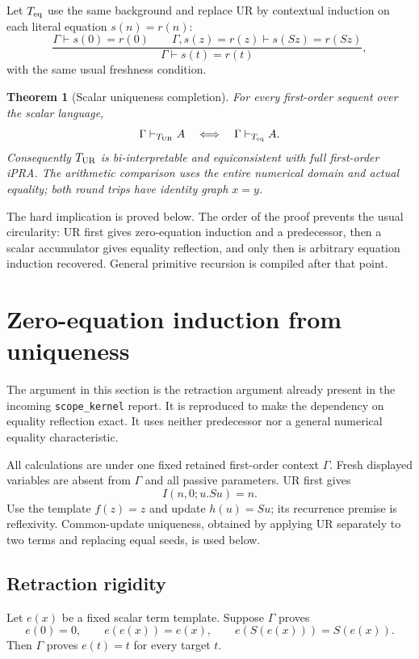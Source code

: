 \documentclass[11pt]{article}
\newtheorem{theorem}{Theorem}[section]
\begin{document}
Let $T_{\rm eq}$ use the same background and replace UR by contextual
induction on each literal equation $s(n)=r(n)$:
\[
 \frac{\Gamma\vdash s(0)=r(0)\qquad
       \Gamma,s(z)=r(z)\vdash s(Sz)=r(Sz)}
      {\Gamma\vdash s(t)=r(t)},                         \tag{EI}
\]
with the same usual freshness condition.

\begin{theorem}[Scalar uniqueness completion]
For every first-order sequent over the scalar language,
\[
                  \Gamma\vdash_{T_{\rm UR}} A
       \quad\Longleftrightarrow\quad
                  \Gamma\vdash_{T_{\rm eq}} A.
\]
Consequently $T_{\rm UR}$ is bi-interpretable and equiconsistent with full
first-order iPRA.  The arithmetic comparison uses the entire numerical
domain and actual equality; both round trips have identity graph $x=y$.
\end{theorem}

The hard implication is proved below.  The order of the proof prevents
the usual circularity: UR first gives zero-equation induction and a
predecessor, then a scalar accumulator gives equality reflection, and
only then is arbitrary equation induction recovered.  General
primitive recursion is compiled after that point.


\section{Zero-equation induction from uniqueness}
\label{sec:ur-retraction-complete}

The argument in this section is the retraction argument already present in
the incoming \texttt{scope\_kernel} report.  It is reproduced to make the
dependency on equality reflection exact.  It uses neither predecessor nor
a general numerical equality characteristic.

All calculations are under one fixed retained first-order context
$\Gamma$.  Fresh displayed variables are absent from $\Gamma$ and all
passive parameters.  UR first gives
\[
                         I(n,0;u.Su)=n.                  \tag{Id}
\]
Use the template $f(z)=z$ and update $h(u)=Su$; its recurrence premise is
reflexivity.  Common-update uniqueness, obtained by applying UR separately
to two terms and replacing equal seeds, is used below.

\subsection{Retraction rigidity}
Let $e(x)$ be a fixed scalar term template.  Suppose $\Gamma$ proves
\[
 e(0)=0,\qquad e(e(x))=e(x),\qquad e(S(e(x)))=S(e(x)).    \tag{Ret}
\]
Then $\Gamma$ proves $e(t)=t$ for every target $t$.
\end{document}
